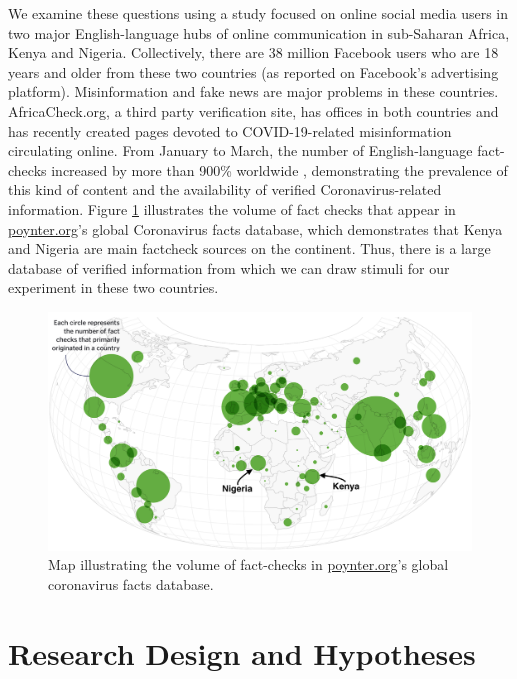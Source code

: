 \documentclass[letterpaper, 12pt, parskip=full,DIV=12]{scrartcl}
\begin{document}
We examine these questions using a study focused on online social media users in two major English-language hubs of online communication in sub-Saharan Africa, Kenya and Nigeria.  Collectively, there are 38 million Facebook users who are 18 years and older from these two countries (as reported on Facebook's advertising platform). Misinformation and fake news are major problems in these countries. AfricaCheck.org, a third party verification site, has offices in both countries and has recently created pages devoted to COVID-19-related misinformation circulating online. From January to March, the number of English-language fact-checks increased by more than 900\% worldwide \citep{brennen2020types}, demonstrating the prevalence of this kind of content and the availability of verified Coronavirus-related information.  Figure \ref{fig:poynter} illustrates the volume of fact checks that appear in \url{poynter.org}'s global Coronavirus facts database, which demonstrates that Kenya and Nigeria are main factcheck sources on the continent. Thus, there is a large database of verified information from which we can draw stimuli for our experiment in these two countries. 


\begin{figure}[htb]
\centering
\caption{Map illustrating the volume of fact-checks in \url{poynter.org}'s global coronavirus facts database.}
\label{fig:poynter}
\includegraphics[width=.95\textwidth]{poynter2.png}
\end{figure}


\section{Research Design and Hypotheses}
\end{document}
